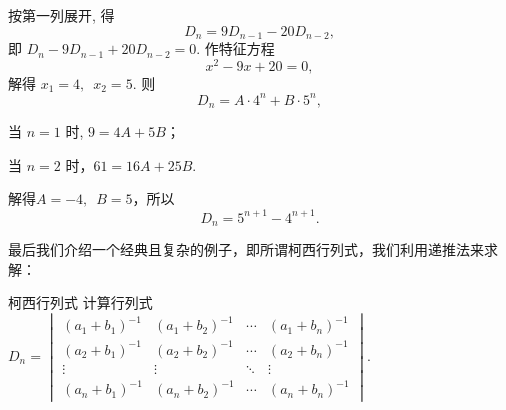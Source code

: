 \begin{solution}
    按第一列展开, 得
    \[ D_n=9 D_{n-1}-20 D_{n-2}, \]
    即 $ D_n-9 D_{n-1}+20 D_{n-2}=0 $.
    作特征方程
    \[ x^{2}-9 x+20=0, \]
    解得 $ x_1=4,\enspace x_2=5 $. 则
    \[ D_n=A \cdot 4^n+B \cdot 5^n, \]

    当 $n=1$ 时, $9=4A+5B$；

    当 $n=2$ 时，$61=16A+25B$.

    解得$A=-4,\enspace B=5$，所以
    \[ D_n=5^{n+1}-4^{n+1}. \]
\end{solution}

最后我们介绍一个经典且复杂的例子，即所谓柯西行列式，我们利用递推法来求解：

\begin{example}{柯西行列式}{}
    计算行列式 $D_n=\begin{vmatrix}
            (a_1+b_1)^{-1} & (a_1+b_2)^{-1} & \cdots & (a_1+b_n)^{-1} \\
            (a_2+b_1)^{-1} & (a_2+b_2)^{-1} & \cdots & (a_2+b_n)^{-1} \\
            \vdots         & \vdots         & \ddots & \vdots         \\
            (a_n+b_1)^{-1} & (a_n+b_2)^{-1} & \cdots & (a_n+b_n)^{-1}
        \end{vmatrix}$.
\end{example}


